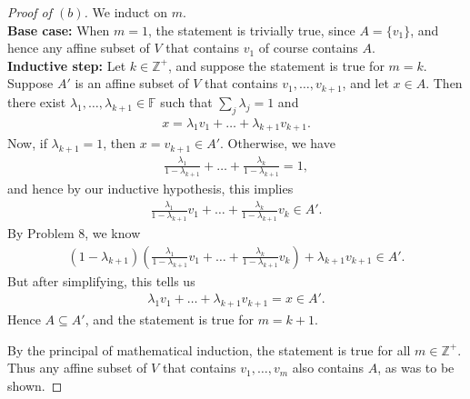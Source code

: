 \documentclass[11pt]{extarticle}
\newcommand{\Z}{\mathbb{Z}}
\newcommand{\F}{\mathbb{F}}
\begin{document}
\begin{proof}[Proof of $(b)$]
We induct on $m$.\\
\textbf{Base case:} When $m = 1$, the statement is trivially true, since $A = \{v_1\}$, and hence any affine subset of $V$ that contains $v_1$ of course contains $A$.\\
\textbf{Inductive step:} Let $k\in\Z^+$, and suppose the statement is true for $m = k$.  Suppose $A'$ is an affine subset of $V$ that contains $v_1,\dots, v_{k + 1}$, and let $x\in A$.  Then there exist $\lambda_1,\dots, \lambda_{k + 1}\in\F$ such that $\sum_{j}\lambda_j = 1$ and
\begin{align*}
x = \lambda_1v_1 + \dots + \lambda_{k+1}v_{k+1}.
\end{align*}
Now, if $\lambda_{k + 1} = 1$, then $x = v_{k + 1}\in A'$.  Otherwise, we have
\begin{align*}
\frac{\lambda_1}{1 - \lambda_{k + 1}} + \dots + \frac{\lambda_{k}}{1-\lambda_{k + 1}} = 1,
\end{align*}
and hence by our inductive hypothesis, this implies
\begin{align*}
\frac{\lambda_1}{1 - \lambda_{k + 1}}v_1 + \dots + \frac{\lambda_{k}}{1-\lambda_{k + 1}}v_k \in A'.
\end{align*}
By Problem 8, we know
\begin{align*}
(1 - \lambda_{k + 1})\left(\frac{\lambda_1}{1 - \lambda_{k + 1}}v_1 + \dots + \frac{\lambda_{k}}{1-\lambda_{k + 1}}v_k\right) + \lambda_{k + 1}v_{k + 1}\in A'.
\end{align*}
But after simplifying, this tells us
\begin{align*}
\lambda_1v_1 + \dots + \lambda_{k+1}v_{k+1} = x \in A'.
\end{align*}
Hence $A\subseteq A'$, and the statement is true for $m = k + 1$.
\par By the principal of mathematical induction, the statement is true for all $m\in\Z^+$.  Thus any affine subset of $V$ that contains $v_1,\dots, v_m$ also contains $A$, as was to be shown.
\end{proof}
\end{document}
